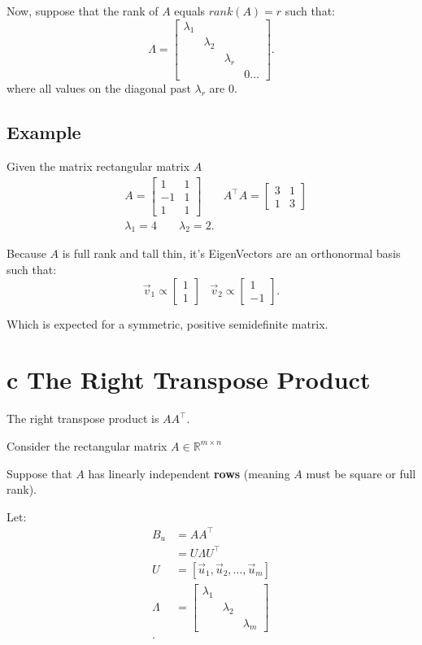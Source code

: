 \documentclass[12pt]{book}
\begin{document}
Now, suppose that the rank of $A$ equals  $rank(A) = r$ such that:
\[
\Lambda =        \begin{bmatrix} \lambda_1  & & & \\ & \lambda_2 & & \\ & & \lambda_r & \\ & & & 0\ldots \end{bmatrix} 
.\] 
where all values on the diagonal past $\lambda_r$ are 0.

\subsection*{Example}
Given the matrix rectangular matrix $A$
 \begin{align*}
         &A = \begin{bmatrix} 1 & 1 \\ -1 & 1\\ 1 & 1 \end{bmatrix} &A^\top A = \begin{bmatrix} 3 & 1\\ 1 & 3 \end{bmatrix}\\
         &\lambda_1 = 4\;\;\;\;\;\;\;\lambda_2 = 2
.\end{align*}

Because $A$ is full rank and tall thin, it's EigenVectors are an orthonormal basis such that:
 \[
\vec v_1 \propto \begin{bmatrix} 1\\1 \end{bmatrix}\;\;\;\vec v_2 \propto \begin{bmatrix} 1\\-1 \end{bmatrix}  
.\] 

Which is expected for a symmetric, positive semidefinite matrix.


\section*{c The Right Transpose Product}
The right transpose product is $A A^\top$.

Consider the rectangular matrix $A\in\mathbb{R}^{m\times n}$

Suppose that $A$ has linearly independent  \textbf{rows} (meaning $A$ must  be square or full rank).

Let:
\begin{align*}
        B_u &= A A^\top\\
        &= U\Lambda U^\top\\
        U &= [\vec u_1, \vec u_2, \ldots, \vec u_m ]\\
        \Lambda &= \begin{bmatrix} \lambda_1  & & \\ & \lambda_2 & \\ & & \lambda_m \end{bmatrix}  \\
.\end{align*}
\end{document}
